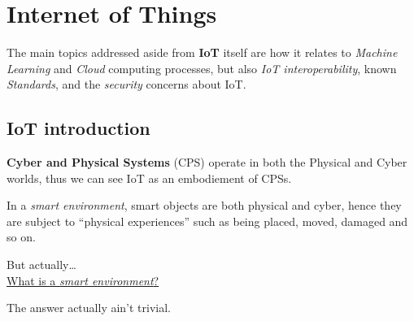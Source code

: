 \chapter{Internet of Things}

The main topics addressed aside from \textbf{IoT} itself are how it relates to \textit{Machine Learning} and \textit{Cloud} computing processes, but also \textit{IoT interoperability}, known \textit{Standards}, and the \textit{security} concerns about IoT.

\section{IoT introduction}
\textbf{Cyber and Physical Systems} (CPS) operate in both the Physical and Cyber worlds, thus we can see IoT as an embodiement of CPSs.

In a \textit{smart environment}, smart objects are both physical and cyber, hence they are subject to ``physical experiences'' such as being placed, moved, damaged and so on.
\begin{center}
   But actually\dots\\
   \ul{What is a \textit{smart environment}?}
\end{center}

The answer actually ain't trivial.